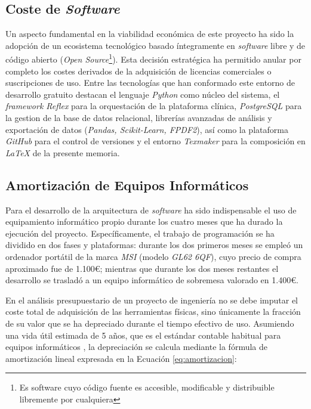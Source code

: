 \subsection{Coste de \textit{Software}}
Un aspecto fundamental en la viabilidad económica de este proyecto ha sido la adopción de un ecosistema tecnológico basado íntegramente en \textit{software} libre y de código abierto (\textit{Open Source}\footnote{Es software cuyo código fuente es accesible, modificable y distribuible libremente por cualquiera}). Esta decisión estratégica ha permitido anular por completo los costes derivados de la adquisición de licencias comerciales o suscripciones de uso. Entre las tecnologías que han conformado este entorno de desarrollo gratuito destacan el lenguaje \textit{Python} como núcleo del sistema, el \textit{framework Reflex} para la orquestación de la plataforma clínica, \textit{PostgreSQL} para la gestion de la base de datos relacional, librerías avanzadas de análisis y exportación de datos (\textit{Pandas, Scikit-Learn, FPDF2}), así como la plataforma \textit{GitHub} para el control de versiones y el entorno \textit{Texmaker} para la composición en \textit{LaTeX} de la presente memoria.

\subsection{Amortización de Equipos Informáticos}

Para el desarrollo de la arquitectura de \textit{software} ha sido indispensable el uso de equipamiento informático propio durante los cuatro meses que ha durado la ejecución del proyecto. Específicamente, el trabajo de programación se ha dividido en dos fases y plataformas: durante los dos primeros meses se empleó un ordenador portátil de la marca \textit{MSI} (modelo \textit{GL62 6QF}), cuyo precio de compra aproximado fue de 1.100€; mientras que durante los dos meses restantes el desarrollo se trasladó a un equipo informático de sobremesa valorado en 1.400€.

En el análisis presupuestario de un proyecto de ingeniería no se debe imputar el coste total de adquisición de las herramientas físicas, sino únicamente la fracción de su valor que se ha depreciado durante el tiempo efectivo de uso. Asumiendo una vida útil estimada de 5 años, que es el estándar contable habitual para equipos informáticos \cite{ing}, la depreciación se calcula mediante la fórmula de amortización lineal expresada en la Ecuación \ref{eq:amortizacion}:

